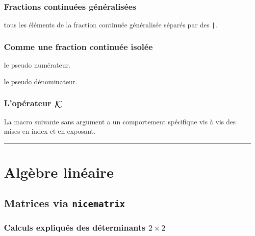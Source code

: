\documentclass[12pt,a4paper]{book}
\theoremstyle{definition}
\newcommand\separation{
	\medskip
	\hfill\rule{0.5\textwidth}{0.75pt}\hfill
	\medskip
}
\begin{document}
{{\subsubsection{Fractions continuées généralisées}





\IDarg{} tous les éléments de la fraction continuée généralisée séparés par des \verb+|+.




\subsubsection{Comme une fraction continuée isolée}




 le pseudo numérateur.

 le pseudo dénominateur.




\subsubsection{\texorpdfstring{L'opérateur $\contfracope$}%
                           {L'opérateur K}}



La macro suivante sans argument a un comportement spécifique vis à vis des mises en index et en exposant. 


\separation







\section{Algèbre linéaire}

\subsection{Matrices via \texttt{nicematrix}}

\subsubsection{\texorpdfstring{Calculs expliqués des déterminants $2 \times 2$}%
                           {Calculs expliqués des déterminants 2x2}} \label{tnslinalg-2D-det}



}}
\end{document}
